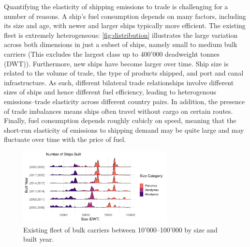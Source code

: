 \documentclass[hidelinks, 12pt,letterpaper]{article}
\begin{document}
Quantifying the elasticity of shipping emissions to trade is challenging for a number of reasons. A ship's fuel consumption depends on many factors, including its size and age, with newer and larger ships typically more efficient. The existing fleet is extremely heterogeneous: \autoref{fig:distribution} illustrates the large variation across both dimensions in just a subset of ships, namely small to medium bulk carriers (This excludes the largest class up to 400'000 deadweight tonnes (DWT)). Furthermore, new ships have become larger over time. Ship size is related to the volume of trade, the type of products shipped, and port and canal infrastructure. As such, different bilateral trade relationships involve different sizes of ships and hence different fuel efficiency, leading to heterogenous emissions--trade elasticity across different country pairs. In addition, the presence of trade imbalances means ships often travel without cargo on certain routes. Finally, fuel consumption depends roughly cubicly on speed, meaning that the short-run elasticity of emissions to shipping demand may be quite large and may fluctuate over time with the price of fuel. 

\begin{figure}[h]
  \centering
  \includegraphics[width = 0.7\textwidth]{WFR_Bulkers_Exploration_Size_Built_horizontalridges.png}
  \caption{Existing fleet of bulk carriers between 10'000--100'000 by size and built year.}
  \label{fig:distribution}
\end{figure} 
\end{document}

